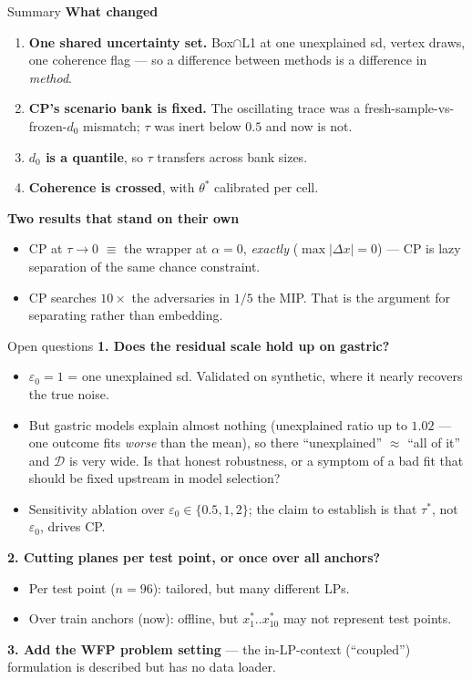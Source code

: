 \documentclass{beamer}
\begin{document}
\begin{frame}{Summary}
  \small
  \textbf{What changed}
  \begin{enumerate}
    \item \textbf{One shared uncertainty set.} Box$\cap$L1 at one unexplained sd,
      vertex draws, one coherence flag --- so a difference between methods is a
      difference in \emph{method}.
    \item \textbf{CP's scenario bank is fixed.} The oscillating trace was a
      fresh-sample-vs-frozen-$d_0$ mismatch; $\tau$ was inert below $0.5$ and now
      is not.
    \item \textbf{$d_0$ is a quantile}, so $\tau$ transfers across bank sizes.
    \item \textbf{Coherence is crossed}, with $\theta^\ast$ calibrated per cell.
  \end{enumerate}
  \medskip
  \textbf{Two results that stand on their own}
  \begin{itemize}
    \item CP at $\tau\to0$ $\equiv$ the wrapper at $\alpha=0$, \emph{exactly}
      ($\max|\Delta x| = 0$) --- CP is lazy separation of the same chance
      constraint.
    \item CP searches $10\times$ the adversaries in $1/5$ the MIP. That is the
      argument for separating rather than embedding.
  \end{itemize}
\end{frame}

\begin{frame}{Open questions}
  \small
  \textbf{1. Does the residual scale hold up on gastric?}
  \begin{itemize}
    \item $\varepsilon_0=1$ = one unexplained sd. Validated on synthetic, where it
      nearly recovers the true noise.
    \item But gastric models explain almost nothing (unexplained ratio up to
      $1.02$ --- one outcome fits \emph{worse} than the mean), so there
      ``unexplained'' $\approx$ ``all of it'' and $\mathcal D$ is very wide. Is
      that honest robustness, or a symptom of a bad fit that should be fixed
      upstream in model selection?
    \item Sensitivity ablation over $\varepsilon_0\in\{0.5,1,2\}$; the claim to
      establish is that $\tau^\ast$, not $\varepsilon_0$, drives CP.
  \end{itemize}
  \medskip
  \textbf{2. Cutting planes per test point, or once over all anchors?}
  \begin{itemize}
    \item Per test point ($n=96$): tailored, but many different LPs.
    \item Over train anchors (now): offline, but $x^\ast_1..x^\ast_{10}$ may not
      represent test points.
  \end{itemize}
  \medskip
  \textbf{3. Add the WFP problem setting} --- the in-LP-context (``coupled'')
  formulation is described but has no data loader.
\end{frame}
\end{document}
